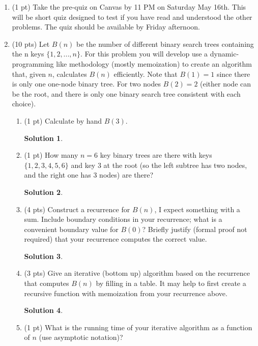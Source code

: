 \documentclass[11pt]{article}
\newtheorem*{solution}{Solution}
\begin{document}
\begin{enumerate}

\item (1 pt) Take the pre-quiz on Canvas by 11 PM on Saturday May 16th.  This will be short quiz designed to test
 if you have read and understood the other problems.  The quiz should be available by Friday afternoon.

\item (10 pts) 
Let $B(n)$ be the number of different binary search trees containing the n keys $\{1, 2, . . . , n\}$. 
For this problem you will develop use a dynamic-programming like methodology (mostly memoization) to create
an algorithm that, given $n$, calculates $B(n)$ efficiently.
Note that $B(1) = 1$ since there is only one one-node binary tree. 
For two nodes $B(2) = 2$ (either node can be the root, and there is only one binary search tree consistent with each choice).
\begin{enumerate}
\item (1 pt) Calculate by hand $B(3)$.
\begin{solution}
 
 
\end{solution}
 \newpage
\item (1 pt) How many $n = 6$ key binary trees are there with keys $\{1,2,3,4,5,6\}$ and key 3 at the root 
(so the left subtree has two nodes, and the right one has 3 nodes) are there?
\begin{solution}

\end{solution}
\newpage
\item (4 pts) Construct a recurrence for $B(n)$, I expect something with a sum.
Include boundary conditions in your recurrence; what is a convenient boundary value for $B(0)$?  
Briefly justify (formal proof not required) that your recurrence computes the correct value.

\begin{solution}

\end{solution}
\newpage
\item (3 pts) Give an iterative (bottom up) algorithm based on the recurrence that computes $B(n)$ by filling in a table.
It may help to first create a recursive function with memoization from your recurrence above.
\begin{solution}

\end{solution}
\newpage


\item (1 pt) What is the running time of your iterative algorithm as a function of $n$ (use asymptotic notation)?
\end{enumerate}
 

\end{enumerate}
\end{document}
